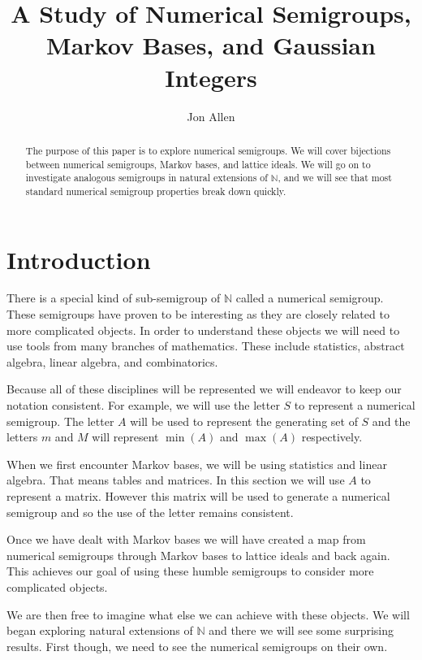 \documentclass[11pt]{amsart}
\theoremstyle{plain}
\theoremstyle{definition}
\begin{document}
\title{A Study of Numerical Semigroups, Markov Bases, and Gaussian Integers}
\author{Jon Allen}
\begin{abstract}
The purpose of this paper is to explore numerical semigroups. We will cover bijections between numerical semigroups, Markov bases, and lattice ideals. We will go on to investigate analogous semigroups in natural extensions of $\mathbb{N}$, and we will see that most standard numerical semigroup properties break down quickly.
\end{abstract}
\maketitle
\section{Introduction}
There is a special kind of sub-semigroup of $\mathbb{N}$ called a numerical semigroup. These semigroups have proven to be interesting as they are closely related to more complicated objects. In order to understand these objects we will need to use tools from many  branches of mathematics. These include statistics, abstract algebra, linear algebra, and combinatorics.

Because all of these disciplines will be represented we will endeavor to keep our notation consistent. For example, we will use the letter $S$ to represent a numerical semigroup. The letter $A$ will be used to represent the generating set of $S$ and the letters $m$ and $M$ will represent $\min(A)$ and $\max(A)$ respectively.

When we first encounter Markov bases, we will be using statistics and linear algebra. That means tables and matrices. In this section we will use $A$ to represent a matrix. However this matrix will be used to generate a numerical semigroup and so the use of the letter remains consistent.

Once we have dealt with Markov bases we will have created a map from numerical semigroups through Markov bases to lattice ideals and back again. This achieves our goal of using these humble semigroups to consider more complicated objects.

We are then free to imagine what else we can achieve with these objects. We will began exploring natural extensions of $\mathbb{N}$ and there we will see some surprising results. First though, we need to see the numerical semigroups on their own.
\end{document}
